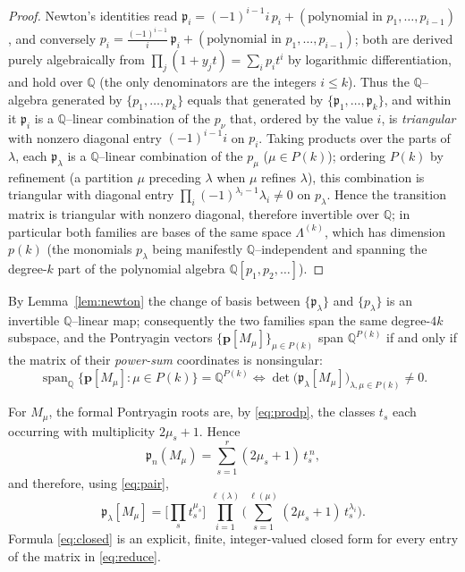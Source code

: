 \documentclass[12pt]{article}
\theoremstyle{definition}
\begin{document}
\begin{proof}
Newton's identities read $\mathfrak p_i=(-1)^{i-1} i\,p_i+(\text{polynomial in }p_1,\dots,p_{i-1})$,
and conversely $p_i=\tfrac{(-1)^{i-1}}{i}\,\mathfrak p_i+(\text{polynomial in }p_1,\dots,p_{i-1})$;
both are derived purely algebraically from $\prod_j(1+y_j t)=\sum_i p_i t^i$ by logarithmic
differentiation, and hold over $\mathbb{Q}$ (the only denominators are the integers $i\le k$).
Thus the $\mathbb{Q}$--algebra generated by $\{p_1,\dots,p_k\}$ equals that generated by
$\{\mathfrak p_1,\dots,\mathfrak p_k\}$, and within it $\mathfrak p_i$ is a $\mathbb{Q}$--linear
combination of the $p_\nu$ that, ordered by the value $i$, is \emph{triangular} with nonzero
diagonal entry $(-1)^{i-1}i$ on $p_i$. Taking products over the parts of $\lambda$, each
$\mathfrak p_\lambda$ is a $\mathbb{Q}$--linear combination of the $p_\mu$ ($\mu\in P(k)$);
ordering $P(k)$ by refinement (a partition $\mu$ preceding $\lambda$ when $\mu$ refines
$\lambda$), this combination is triangular with diagonal entry
$\prod_i(-1)^{\lambda_i-1}\lambda_i\ne0$ on $p_\lambda$. Hence the transition matrix is
triangular with nonzero diagonal, therefore invertible over $\mathbb{Q}$; in particular both
families are bases of the same space $\Lambda^{(k)}$, which has dimension $p(k)$ (the monomials
$p_\lambda$ being manifestly $\mathbb{Q}$--independent and spanning the degree-$k$ part of the
polynomial algebra $\mathbb{Q}[p_1,p_2,\dots]$).
\end{proof}

By Lemma~\ref{lem:newton} the change of basis between $\{\mathfrak p_\lambda\}$ and
$\{p_\lambda\}$ is an invertible $\mathbb{Q}$--linear map; consequently the two families
span the same degree-$4k$ subspace, and the Pontryagin vectors
$\{\mathbf p[M_\mu]\}_{\mu\in P(k)}$ span $\mathbb{Q}^{P(k)}$ if and only if the matrix of
their \emph{power-sum} coordinates is nonsingular:
\[
\operatorname{span}_\mathbb{Q}\{\mathbf{p}[M_\mu]:\mu\in P(k)\}
=\mathbb{Q}^{P(k)}
\iff
\det\big(\mathfrak{p}_\lambda[M_\mu]\big)_{\lambda,\mu\in P(k)}\neq 0.
\tag{6}\label{eq:reduce}
\]

For $M_\mu$, the formal Pontryagin roots are, by \eqref{eq:prodp}, the classes $t_s$ each
occurring with multiplicity $2\mu_s+1$.  Hence
\[
\mathfrak{p}_n(M_\mu)=\sum_{s=1}^{r}(2\mu_s+1)\,t_s^{\,n},
\]
and therefore, using \eqref{eq:pair},
\[
\mathfrak{p}_\lambda[M_\mu]
=\Big[\textstyle\prod_{s} t_s^{\mu_s}\Big]\
\prod_{i=1}^{\ell(\lambda)}\Big(\sum_{s=1}^{\ell(\mu)}(2\mu_s+1)\,t_s^{\lambda_i}\Big).
\tag{7}\label{eq:closed}
\]
Formula \eqref{eq:closed} is an explicit, finite, integer-valued closed form for every
entry of the matrix in \eqref{eq:reduce}.
\end{document}
